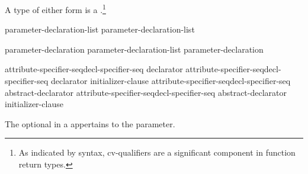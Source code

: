 \pnum
{}%
A type of either form is a .\footnote{As indicated by syntax, cv-qualifiers are a significant component in function return types.}

%
\begin{bnf}
\br
    parameter-declaration-list\opt{} \opt\br
    parameter-declaration-list 
\end{bnf}

\begin{bnf}
\br
    parameter-declaration\br
    parameter-declaration-list \terminal{,} parameter-declaration
\end{bnf}

\begin{bnf}
\br
    attribute-specifier-seq\opt decl-specifier-seq declarator\br
    attribute-specifier-seq\opt decl-specifier-seq declarator \terminal{=} initializer-clause\br
    attribute-specifier-seq\opt decl-specifier-seq abstract-declarator\opt\br
    attribute-specifier-seq\opt decl-specifier-seq abstract-declarator\opt{} \terminal{=} initializer-clause
\end{bnf}

The optional  in a 
appertains to the parameter.

